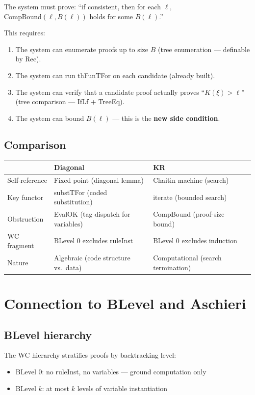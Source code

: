 \documentclass[11pt]{article}
\begin{document}
The system must prove: ``if consistent, then for each $\ell$, $\mathrm{CompBound}(\ell, B(\ell))$ holds for some $B(\ell)$.''

This requires:
\begin{enumerate}
\item The system can enumerate proofs up to size $B$ (tree enumeration --- definable by Rec).
\item The system can run thFunTFor on each candidate (already built).
\item The system can verify that a candidate proof actually proves ``$K(\xi) > \ell$'' (tree comparison --- IfLf + TreeEq).
\item The system can bound $B(\ell)$ --- this is the \textbf{new side condition}.
\end{enumerate}

\subsection{Comparison}

\begin{center}
\begin{tabular}{l|l|l}
& \textbf{Diagonal} & \textbf{KR} \\
\hline
Self-reference & Fixed point (diagonal lemma) & Chaitin machine (search) \\
Key functor & substTFor (coded substitution) & iterate (bounded search) \\
Obstruction & EvalOK (tag dispatch for variables) & CompBound (proof-size bound) \\
WC fragment & BLevel 0 excludes ruleInst & BLevel 0 excludes induction \\
Nature & Algebraic (code structure vs.\ data) & Computational (search termination) \\
\end{tabular}
\end{center}

\section{Connection to BLevel and Aschieri}

\subsection{BLevel hierarchy}

The WC hierarchy stratifies proofs by backtracking level:
\begin{itemize}
\item BLevel 0: no ruleInst, no variables --- ground computation only
\item BLevel $k$: at most $k$ levels of variable instantiation
\end{itemize}
\end{document}

